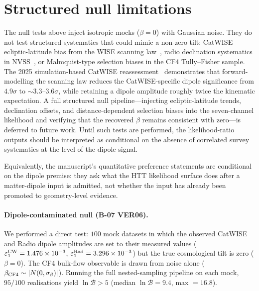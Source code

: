 \section{Structured null limitations}
\label{sec:struct-null}

The null tests above inject isotropic mocks ($\beta = 0$) with
Gaussian noise.  They do not test structured systematics that
could mimic a non-zero tilt: CatWISE ecliptic-latitude bias from
the WISE scanning law~\cite{Bashir2025}, radio declination
systematics in NVSS~\cite{Singal2024}, or Malmquist-type
selection biases in the CF4 Tully--Fisher sample.  The 2025
simulation-based CatWISE
reassessment~\cite{Bashir2025} demonstrates that
forward-modelling the scanning law reduces the CatWISE-specific
dipole significance from $4.9\sigma$ to $\sim\!3.3$--$3.6\sigma$,
while retaining a dipole amplitude roughly twice the kinematic
expectation.  A full structured null pipeline---injecting
ecliptic-latitude trends, declination offsets, and
distance-dependent selection biases into the seven-channel
likelihood and verifying that the recovered $\beta$ remains
consistent with zero---is deferred to future work.  Until such tests
are performed, the likelihood-ratio outputs should be interpreted
as conditional on the absence of correlated survey systematics at
the level of the dipole signal.

Equivalently, the manuscript's quantitative preference statements are
conditional on the dipole premise: they ask what the HTT likelihood
surface does after a matter-dipole input is admitted, not whether the
input has already been promoted to geometry-level evidence.

\paragraph{Dipole-contaminated null (B-07 VER06).}
We performed a direct test: $100$ mock datasets in which
the observed CatWISE and Radio dipole amplitudes are set to their
measured values ($\varepsilon_1^{\rm CW} = 1.476 \times 10^{-3}$,
$\varepsilon_1^{\rm Rad} = 3.296 \times 10^{-3}$) but
the true cosmological tilt is zero ($\beta = 0$).
The CF4 bulk-flow observable is drawn from noise alone
($\beta_{\rm CF4} \sim |N(0, \sigma_\beta)|$).
Running the full nested-sampling pipeline on each mock,
$95/100$ realisations yield $\ln\mathcal{B} > 5$
(median $\ln\mathcal{B} = 9.4$, max $= 16.8$).

